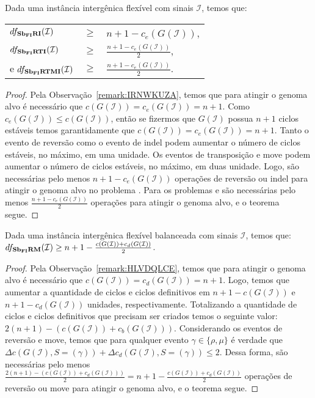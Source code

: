 \begin{theorem}\label{theorem:SZNBDWOM}
Dada uma instância intergênica flexível com sinais $\mathcal{I}$, temos que:

\begin{tabular}{lll}
  $df_{\textbf{Sb\textsubscript{FI}RI}}(\mathcal{I})$       & $ \ge $ & ${n+1} - c_e(G(\mathcal{I} ))$, \\
  $df_{\textbf{Sb\textsubscript{FI}RTI}}(\mathcal{I})$      & $ \ge $ & $\frac{{n+1} - c_e(G(\mathcal{I} ))}{2}$, \\
  e $df_{\textbf{Sb\textsubscript{FI}RTMI}}(\mathcal{I})$   & $ \ge $ & $\frac{{n+1} - c_e(G(\mathcal{I} ))}{2}$. \\
\end{tabular}
\end{theorem}
\begin{proof}
Pela Observação~\ref{remark:IRNWKUZA}, temos que para atingir o genoma alvo é necessário que $c(G(\mathcal{I})) = c_e(G(\mathcal{I})) = n+1$. Como $c_e(G(\mathcal{I})) \le c(G(\mathcal{I}))$, então se fizermos que $G(\mathcal{I})$ possua $n+1$ ciclos estáveis temos garantidamente que $c(G(\mathcal{I})) = c_e(G(\mathcal{I})) = n+1$. Tanto o evento de reversão como o evento de indel podem aumentar o número de ciclos estáveis, no máximo, em uma unidade. Os eventos de transposição e move podem aumentar o número de ciclos estáveis, no máximo, em duas unidade. Logo, são necessárias pelo menos ${n+1} - c_e(G(\mathcal{I} ))$ operações de reversão ou indel para atingir o genoma alvo no problema \SbFIRI{}. Para os problemas \SbFIRTI{} e \SbFIRTMI{} são necessárias pelo menos $\frac{{n+1} - c_e(G(\mathcal{I} ))}{2}$ operações para atingir o genoma alvo, e o teorema segue. 
\end{proof}

\begin{theorem}\label{theorem:CNMFNKPK}
Dada uma instância intergênica flexível balanceada com sinais $\mathcal{I}$, temos que: $df_{\textbf{Sb\textsubscript{FI}RM}}(\mathcal{I}) \ge {n+1} - \frac{c(G(\mathcal{I} )) + c_d(G(\mathcal{I} ))}{2}$.
\end{theorem}
\begin{proof}
Pela Observação~\ref{remark:HLVDQLCE}, temos que para atingir o genoma alvo é necessário que $c(G(\mathcal{I})) = c_d(G(\mathcal{I})) = n+1$. Logo, temos que aumentar a quantidade de ciclos e ciclos definitivos em ${n+1} - c(G(\mathcal{I}))$ e ${n+1} - c_d(G(\mathcal{I}))$ unidades, respectivamente. Totalizando a quantidade de ciclos e ciclos definitivos que precisam ser criados temos o seguinte valor: $2(n+1) - (c(G(\mathcal{I})) + c_b(G(\mathcal{I})))$. Considerando os eventos de reversão e move, temos que para qualquer evento $\gamma \in \{\rho, \mu\}$ é verdade que $\Delta c(G(\mathcal{I}), S=(\gamma)) + \Delta c_d(G(\mathcal{I}), S=(\gamma)) \le 2$. Dessa forma, são necessárias pelo menos $\frac{2({n+1}) - (c(G(\mathcal{I})) + c_d(G(\mathcal{I})))}{2} = {n+1} - \frac{c(G(\mathcal{I} )) + c_d(G(\mathcal{I} ))}{2}$ operações de reversão ou move para atingir o genoma alvo, e o teorema segue. 
\end{proof}

